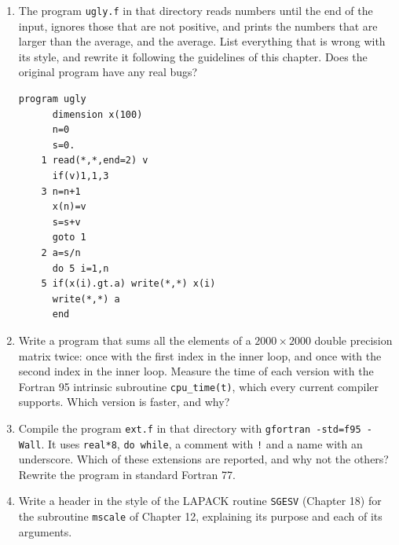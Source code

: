 \begin{enumerate}
    \item The program \texttt{ugly.f} in that directory reads numbers until the end of the input, ignores those that are not positive, and prints the numbers that are larger than the average, and the average. List everything that is wrong with its style, and rewrite it following the guidelines of this chapter. Does the original program have any real bugs?

\begin{lstlisting}[style=fortran77]
      program ugly
      dimension x(100)
      n=0
      s=0.
    1 read(*,*,end=2) v
      if(v)1,1,3
    3 n=n+1
      x(n)=v
      s=s+v
      goto 1
    2 a=s/n
      do 5 i=1,n
    5 if(x(i).gt.a) write(*,*) x(i)
      write(*,*) a
      end
\end{lstlisting}

    \item Write a program that sums all the elements of a $2000 \times 2000$ double precision matrix twice: once with the first index in the inner loop, and once with the second index in the inner loop. Measure the time of each version with the Fortran 95 intrinsic subroutine \texttt{cpu\_time(t)}, which every current compiler supports. Which version is faster, and why?
    \item Compile the program \texttt{ext.f} in that directory with \texttt{gfortran -std=f95 -Wall}. It uses \texttt{real*8}, \texttt{do while}, a comment with \texttt{!} and a name with an underscore. Which of these extensions are reported, and why not the others? Rewrite the program in standard Fortran 77.
    \item Write a header in the style of the LAPACK routine \texttt{SGESV} (Chapter 18) for the subroutine \texttt{mscale} of Chapter 12, explaining its purpose and each of its arguments.
\end{enumerate}

